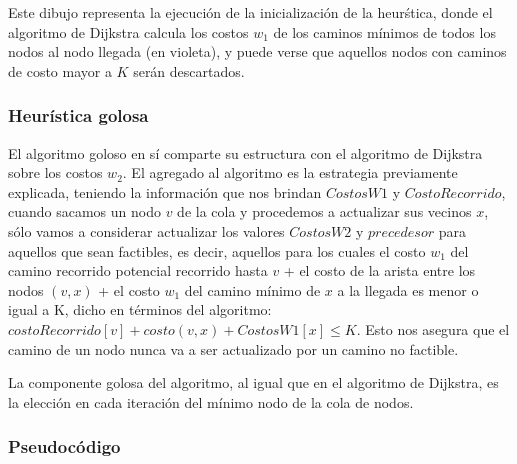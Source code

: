 Este dibujo representa la ejecuci\'on de la inicializaci\'on de la heur\'stica, donde el algoritmo de Dijkstra calcula los costos $w_1$ de los caminos m\'inimos de todos los nodos al nodo llegada (en violeta), y puede verse que aquellos nodos con caminos de costo mayor a $K$ ser\'an descartados.

\subsubsection{Heur\'istica golosa}

El algoritmo goloso en s\'i comparte su estructura con el algoritmo de Dijkstra sobre los costos $w_2$. El agregado al algoritmo es la estrategia previamente explicada, teniendo la informaci\'on que nos brindan $CostosW1$ y $CostoRecorrido$, cuando sacamos un nodo $v$ de la cola y procedemos a actualizar sus vecinos $x$, s\'olo vamos a considerar actualizar los valores $CostosW2$ y $precedesor$ para aquellos que sean factibles, es decir, aquellos para los cuales el costo $w_1$ del camino recorrido potencial recorrido hasta $v$ + el costo de la arista entre los nodos $(v,x)$ +  el costo $w_1$ del camino m\'inimo de $x$ a la llegada es menor o igual a K, dicho en t\'erminos del algoritmo: $costoRecorrido[v]+costo(v,x)+CostosW1[x]\leq K$. Esto nos asegura que el camino de un nodo nunca va a ser actualizado por un camino no factible.

\vspace{2mm}

La componente golosa del algoritmo, al igual que en el algoritmo de Dijkstra, es la elecci\'on en cada iteraci\'on del m\'inimo nodo de la cola de nodos.

\subsubsection{Pseudoc\'odigo}


